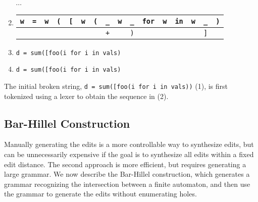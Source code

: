 \documentclass[sigplan,review,anonymous,acmsmall]{acmart}\settopmatter{printfolios=false,printccs=false,printacmref=false}
\begin{document}
\begin{enumerate}[leftmargin=.23\linewidth]
\begin{tabular}{|||c|||c|||c|||c|||c|||c|||c|||c|||c|||c|||c|||c|||c|||c|||c|||}
    \end{tabular}\\$\cdots$
    \item \begin{tabular}{|||c|||c|||c|||c|||c|||c|||c||c|c|||c|||c|||c|||c|||c|||c|||c|||}
            \hline
            \texttt{w} & \texttt{=} & \texttt{w} & \texttt{(} & \texttt{[} & \texttt{w} & \texttt{(} & \cellcolor{black!15}\texttt{\_} &  \texttt{w} & \cellcolor{black!15}\texttt{\_} & \texttt{for} & \texttt{w} & \texttt{in} & \texttt{w} & \cellcolor{black!15}\texttt{\_} & \texttt{)} \\\hline
            & & & & & & & \cellcolor{green!25}\texttt{+} & & \cellcolor{orange!25}\texttt{)} & & & & & \cellcolor{orange!25}\texttt{]} & \\\hline
    \end{tabular}
    \item \texttt{d = sum([foo(\hlgreen{+}i\hlorange{)} for i in vals\hlorange{]})}
    \item \texttt{d = sum([foo(i\hlorange{)} for i in vals\hlorange{]})}
  \end{enumerate}

  The initial broken string, \texttt{d = sum([foo(i\err{]} for i in vals))} (1), is first tokenized using a lexer to obtain the sequence in (2).



  \subsection{Bar-Hillel Construction}

  Manually generating the edits is a more controllable way to synthesize edits, but can be unnecessarily expensive if the goal is to synthesize all edits within a fixed edit distance. The second approach is more efficient, but requires generating a large grammar. We now describe the Bar-Hillel construction, which generates a grammar recognizing the intersection between a finite automaton, and then use the grammar to generate the edits without enumerating holes.
\end{document}
